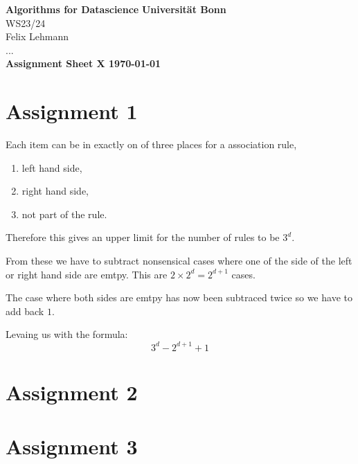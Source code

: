 \documentclass[DIN, pagenumber=false, fontsize=11pt, parskip=half]{scrartcl}
\renewcommand{\title}[1]{{\noindent\Large\textbf{#1}}}
\begin{document}
\noindent\textbf{Algorithms for Datascience} \hfill \textbf{Universität Bonn}\\
WS23/24 \hfill \\
Felix Lehmann \\
... \\

\title{Assignment Sheet X \hfill \today}

\section*{Assignment 1}

Each item can be in exactly on of three places for a association rule,
\begin{enumerate}
    \item left hand side,
    \item right hand side,
    \item not part of the rule.
\end{enumerate}

Therefore this gives an upper limit for the number of rules to be $3^d$.

From these we have to subtract nonsensical cases where one of the side of the left or right hand side are emtpy.
This are $2 \times 2^d = 2^{d+1}$ cases.

The case where both sides are emtpy has now been subtraced twice so we have to add back $1$.

Levaing us with the formula:
\begin{equation*}
    3^d - 2^{d+1} + 1
\end{equation*}

\section*{Assignment 2}



\section*{Assignment 3}
\end{document}
